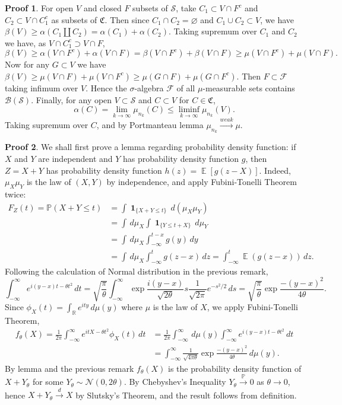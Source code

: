 \documentclass[hidelinks,11pt]{article}
\theoremstyle{definition}
\theoremstyle{dotless}
\newtheorem{prop}{Proof}[section]
\theoremstyle{remark}
\DeclareMathOperator{\E}{\mathbb{E}}
\DeclareMathOperator{\1}{\mathbf{1}}
\begin{document}
\begin{prop}
For open $V$ and closed $F$ subsets of $\mathcal{S}$, take $C_1\subset V\cap F^c$ and $C_2\subset V\cap C_1^c$ as subsets of $\mathfrak{C}$. Then since $C_1\cap C_2=\varnothing$ and $C_1\cup C_2\subset V$, we have $\beta(V)\geq\alpha(C_1\amalg C_2)=\alpha(C_1)+\alpha(C_2)$.
Taking supremum over $C_1$ and $C_2$ we have, as $V\cap C_1^c\supset V\cap F$,
\[\beta(V)\geq\alpha(V\cap F^c)+\alpha(V\cap F)=\beta(V\cap F^c)+\beta(V\cap F)\geq\mu(V\cap F^c)+\mu(V\cap F).\]\medbreak
Now for any $G\subset V$ we have $\beta(V)\geq\mu(V\cap F)+\mu(V\cap F^c)\geq\mu(G\cap F)+\mu(G\cap F^c)$.
Then $F\subset\mathcal{F}$ taking infimum over $V$. Hence the $\sigma$-algebra $\mathcal{F}$ of all $\mu$-measurable sets contains $\mathcal{B}(\mathcal{S})$.\medbreak
Finally, for any open $V\subset\mathcal{S}$ and $C\subset V$ for $C\in\mathfrak{C}$,
\[\alpha(C)=\lim_{k\to\infty}\mu_{n_k}(C)\leq\liminf_{k\to\infty}\mu_{n_k}(V).\]
Taking supremum over $C$, and by Portmanteau lemma $\mu_{n_k}\xrightarrow{weak}\mu$.
\end{prop}

\begin{prop}
We shall first prove a lemma regarding probability density function: if $X$ and $Y$ are independent and $Y$ has probability density function $g$, then $Z=X+Y$ has probability density function $h(z)=\E[g(z-X)]$.\medbreak
Indeed, $\mu_X\mu_Y$ is the law of $(X,Y)$ by independence, and apply Fubini-Tonelli Theorem twice:
\begin{align*}
F_Z(t)=\mathbb{P}(X+Y\leq t)&=\int\1_{\{X+Y\leq t\}}\,d(\mu_X\mu_Y)\\
&=\int\,d\mu_X\int\1_{\{Y\leq t+X\}}\,d\mu_Y\\
&=\int\,d\mu_X\int_{-\infty}^{t-x}g(y)\,dy\\
&=\int\,d\mu_X\int_{-\infty}^tg(z-x)\,dz=\int_{-\infty}^t\E(g(z-x))\,dz.
\end{align*}
Following the calculation of Normal distribution in the previous remark,
\[\int_{-\infty}^\infty e^{i(y-x)t-\theta t^2}\,dt=\sqrt{\frac{\pi}{\theta}}\int_{-\infty}^\infty\exp{\frac{i(y-x)}{\sqrt{2\theta}}s}\frac{1}{\sqrt{2\pi}}e^{-s^2/2}\,ds=\sqrt{\frac{\pi}{\theta}}\exp{\frac{-(y-x)^2}{4\theta}}.\]
Since $\phi_X(t)=\int_\mathbb{R}e^{ity}\,d\mu(y)$ where $\mu$ is the law of $X$, we apply Fubini-Tonelli Theorem,
\begin{align*}
f_\theta(X)=\frac{1}{2\pi}\int_{-\infty}^\infty e^{itX-\theta t^2}\phi_X(t)\,dt&=\frac{1}{2\pi}\int_{-\infty}^\infty\,d\mu(y)\int_{-\infty}^\infty e^{i(y-x)t-\theta t^2}\,dt\\&=\int_{-\infty}^\infty\frac{1}{\sqrt{4\pi\theta}}\exp{\frac{-(y-x)^2}{4\theta}}\,d\mu(y).
\end{align*}
By lemma and the previous remark $f_\theta(X)$ is the probability density function of $X+Y_\theta$ for some $Y_\theta\sim \mathcal{N}(0,2\theta)$. By Chebyshev's Inequality $Y_\theta\xrightarrow{\mathbb{P}}0$ as $\theta\to0$, hence $X+Y_\theta\xrightarrow{d}X$ by Slutsky's Theorem, and the result follows from definition.
\end{prop}
\end{document}
